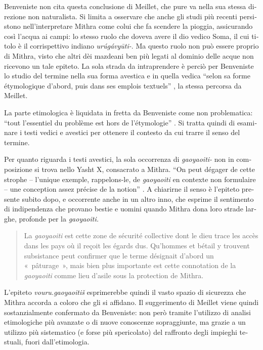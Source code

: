 \documentclass[french,output=paper,colorlinks,citecolor=brown]{../langscibook}
\begin{document}
\begin{otherlanguage}{italian}
Benveniste non cita questa conclusione di Meillet, che pure va nella sua stessa direzione non naturalista. Si limita a osservare che anche gli studi più recenti persistono nell’interpretare Mithra come colui che fa scendere la pioggia, assicurando così l’acqua ai campi: lo stesso ruolo che doveva avere il dio vedico Soma, il cui titolo è il corrispettivo indiano \textit{urúgávyūti{}-}. Ma questo ruolo non può essere proprio di Mithra, visto che altri dèi mazdeani ben più legati al dominio delle acque non ricevono un tale epiteto. La sola strada da intraprendere è perciò per Benveniste lo studio del termine nella sua forma avestica e in quella vedica “selon sa forme étymologique d'abord, puis dans ses emplois textuels” \citep[278]{Benveniste2015}, la stessa percorsa da Meillet. 

La parte etimologica è liquidata in fretta da Benveniste come non problematica: “tout l’essentiel du problème est hors de l’étymologie” \citep[278]{Benveniste2015}. Si tratta quindi di esaminare i testi vedici e avestici per ottenere il contesto da cui trarre il senso del termine.

Per quanto riguarda i testi avestici, la sola occorrenza di \textit{gaoyaoiti-} non in composizione si trova nello Yasht X, consacrato a Mithra. “On peut dégager de cette strophe – l’unique exemple, rappelons-le, de \textit{gaoyaoiti} en contexte non formulaire – une conception assez précise de la notion” \citep[281]{Benveniste2015}. A chiarirne il senso è l’epiteto presente subito dopo, e occorrente anche in un altro inno, che esprime il sentimento di indipendenza che provano bestie e uomini quando Mithra dona loro strade larghe, profonde per la \textit{gaoyaoiti.}

\begin{quote}
    La \textit{gaoyaoiti} est cette zone de sécurité collective dont le dieu trace les accès dans les pays où il reçoit les égards dus. Qu’hommes et bétail y trouvent subsistance peut confirmer que le terme désignait d’abord un «~pâturage~», mais bien plus importante est cette connotation de la \textit{gaoyaoiti} comme lieu d’asile sous la protection de Mithra. \citep[281]{Benveniste2015}
\end{quote}

L’epiteto \textit{vouru.gaoyaoitiš} esprimerebbe quindi il vasto spazio di sicurezza che Mithra accorda a coloro che gli si affidano. Il suggerimento di Meillet viene quindi sostanzialmente confermato da Benveniste: non però tramite l’utilizzo di analisi etimologiche più avanzate o di nuove conoscenze sopraggiunte, ma grazie a un utilizzo più sistematico (e forse più spericolato) del raffronto degli impieghi testuali, fuori dall’etimologia.


\end{otherlanguage}
\end{document}
